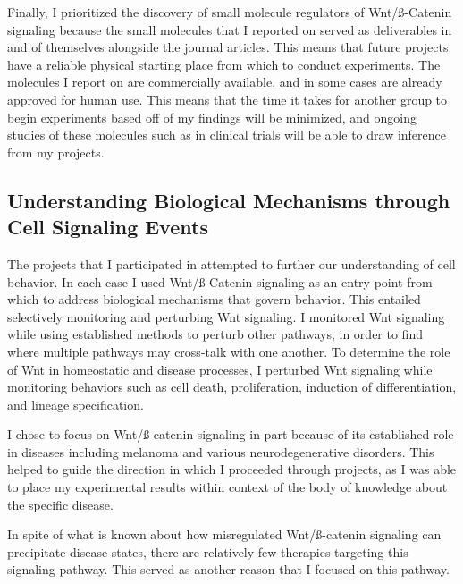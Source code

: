 Finally, I prioritized the discovery of small molecule regulators of Wnt/ß-Catenin signaling because the small molecules that I reported on served as deliverables in and of themselves alongside the journal articles. This means that future projects have a reliable physical starting place from which to conduct experiments. The molecules I report on are commercially available, and in some cases are already approved for human use. This means that the time it takes for another group to begin experiments based off of my findings will be minimized, and ongoing studies of these molecules such as in clinical trials will be able to draw inference from my projects.


\subsection{Understanding Biological Mechanisms through Cell Signaling Events}

The projects that I participated in attempted to further our understanding of  cell behavior. In each case I used Wnt/ß-Catenin signaling as an entry point from which to address biological mechanisms that govern behavior. This entailed selectively monitoring and perturbing Wnt signaling. I monitored Wnt signaling while using established methods to perturb other pathways, in order to find where multiple pathways may cross-talk with one another. To determine the role of Wnt in homeostatic and disease processes, I perturbed Wnt signaling while monitoring behaviors such as cell death, proliferation, induction of differentiation, and lineage specification.

I chose to focus on Wnt/ß-catenin signaling in part because of its established role in diseases including melanoma and various neurodegenerative disorders. This helped to guide the direction in which I proceeded through projects, as I was able to place my experimental results within context of the body of knowledge about the specific disease.

In spite of what is known about how misregulated Wnt/ß-catenin signaling can precipitate disease states, there are relatively few therapies targeting this signaling pathway. This served as another reason that I focused on this pathway.


